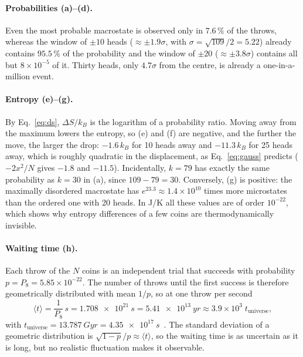 \documentclass[11pt,a4paper]{article}
\begin{document}
\paragraph{Probabilities (a)--(d).} Even the most probable macrostate is observed only in
$7.6\,\%$ of the throws, whereas the window of $\pm10$ heads ($\approx\pm1.9\sigma$, with
$\sigma=\sqrt{109}/2=5.22$) already contains $95.5\,\%$ of the probability and the window of
$\pm20$ ($\approx\pm3.8\sigma$) contains all but $8\times10^{-5}$ of it. Thirty heads, only
$4.7\sigma$ from the centre, is already a one-in-a-million event.

\paragraph{Entropy (e)--(g).} By Eq.~\eqref{eq:ds}, $\Delta S/k_B$ is the logarithm of a
probability ratio. Moving away from the maximum lowers the entropy, so (e) and (f) are
negative, and the further the move, the larger the drop: $-1.6\,k_B$ for 10 heads away and
$-11.3\,k_B$ for 25 heads away, which is roughly quadratic in the displacement, as
Eq.~\eqref{eq:gauss} predicts ($-2x^2/N$ gives $-1.8$ and $-11.5$). Incidentally, $k=79$
has exactly the same probability as $k=30$ in (a), since $109-79=30$. Conversely, (g) is
positive: the maximally disordered macrostate has $e^{23.3}\approx1.4\times10^{10}$ times
more microstates than the ordered one with 20 heads. In \si{J/K} all these values are of order
$10^{-22}$, which shows why entropy differences of a few coins are thermodynamically invisible.

\paragraph{Waiting time (h).} Each throw of the $N$ coins is an independent trial that succeeds
with probability $p=P_8=5.85\times10^{-22}$. The number of throws until the first success is
therefore geometrically distributed with mean $1/p$, so at one throw per second
\begin{equation}
  \langle t\rangle=\frac{1}{P_8}\,\si{s}=\SI{1.708e21}{s}=\SI{5.41e13}{yr}
  \approx 3.9\times10^{3}\;t_{\text{universe}},
  \label{eq:wait}
\end{equation}
with $t_{\text{universe}}=\SI{13.787}{Gyr}=\SI{4.35e17}{s}$~\cite{planck}. The standard deviation
of a geometric distribution is $\sqrt{1-p}/p\approx\langle t\rangle$, so the waiting time is as
uncertain as it is long, but no realistic fluctuation makes it observable.
\end{document}
